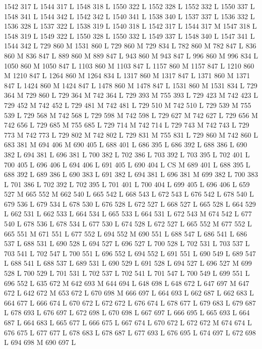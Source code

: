 {{{{{{{{{{{{{{{{{{1542 317 L
1544 317 L
1548 318 L
1550 322 L
1552 328 L
1552 332 L
1550 337 L
1548 341 L
1544 342 L
1542 342 L
1540 341 L
1538 340 L
1537 337 L
1536 332 L
1536 328 L
1537 322 L
1538 319 L
1540 318 L
1542 317 L
1544 317 M 1547 318 L
1548 319 L
1549 322 L
1550 328 L
1550 332 L
1549 337 L
1548 340 L
1547 341 L
1544 342 L
729 860 M 1531 860 L
729 860 M 729 834 L
782 860 M 782 847 L
836 860 M 836 847 L
889 860 M 889 847 L
943 860 M 943 847 L
996 860 M 996 834 L
1050 860 M 1050 847 L
1103 860 M 1103 847 L
1157 860 M 1157 847 L
1210 860 M 1210 847 L
1264 860 M 1264 834 L
1317 860 M 1317 847 L
1371 860 M 1371 847 L
1424 860 M 1424 847 L
1478 860 M 1478 847 L
1531 860 M 1531 834 L
729 364 M 729 860 L
729 364 M 742 364 L
729 393 M 755 393 L
729 423 M 742 423 L
729 452 M 742 452 L
729 481 M 742 481 L
729 510 M 742 510 L
729 539 M 755 539 L
729 568 M 742 568 L
729 598 M 742 598 L
729 627 M 742 627 L
729 656 M 742 656 L
729 685 M 755 685 L
729 714 M 742 714 L
729 743 M 742 743 L
729 773 M 742 773 L
729 802 M 742 802 L
729 831 M 755 831 L
729 860 M 742 860 L
683 381 M 694 406 M 690 405 L
688 401 L
686 395 L
686 392 L
688 386 L
690 382 L
694 381 L
696 381 L
700 382 L
702 386 L
703 392 L
703 395 L
702 401 L
700 405 L
696 406 L
694 406 L
691 405 L
690 404 L
CS M
689 401 L
688 395 L
688 392 L
689 386 L
690 383 L
691 382 L
694 381 L
696 381 M 699 382 L
700 383 L
701 386 L
702 392 L
702 395 L
701 401 L
700 404 L
699 405 L
696 406 L
659 527 M 665 552 M 662 540 L
665 542 L
668 543 L
672 543 L
676 542 L
678 540 L
679 536 L
679 534 L
678 530 L
676 528 L
672 527 L
668 527 L
665 528 L
664 529 L
662 531 L
662 533 L
664 534 L
665 533 L
664 531 L
672 543 M 674 542 L
677 540 L
678 536 L
678 534 L
677 530 L
674 528 L
672 527 L
665 552 M 677 552 L
665 551 M 671 551 L
677 552 L
694 552 M 690 551 L
688 547 L
686 541 L
686 537 L
688 531 L
690 528 L
694 527 L
696 527 L
700 528 L
702 531 L
703 537 L
703 541 L
702 547 L
700 551 L
696 552 L
694 552 L
691 551 L
690 549 L
689 547 L
688 541 L
688 537 L
689 531 L
690 529 L
691 528 L
694 527 L
696 527 M 699 528 L
700 529 L
701 531 L
702 537 L
702 541 L
701 547 L
700 549 L
699 551 L
696 552 L
635 672 M 642 693 M 644 694 L
648 698 L
648 672 L
647 697 M 647 672 L
642 672 M 653 672 L
670 698 M 666 697 L
664 693 L
662 687 L
662 683 L
664 677 L
666 674 L
670 672 L
672 672 L
676 674 L
678 677 L
679 683 L
679 687 L
678 693 L
676 697 L
672 698 L
670 698 L
667 697 L
666 695 L
665 693 L
664 687 L
664 683 L
665 677 L
666 675 L
667 674 L
670 672 L
672 672 M 674 674 L
676 675 L
677 677 L
678 683 L
678 687 L
677 693 L
676 695 L
674 697 L
672 698 L
694 698 M 690 697 L
}}}}}}}}}}}}}}}}}}
